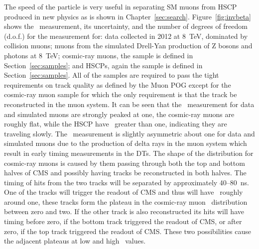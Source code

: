 The speed of the particle is very useful in separating SM muons from HSCP produced in new physics as is shown in Chapter~\ref{sec:search}.
Figure~\ref{fig:invbeta} shows the \invbeta\ measurement, its uncertainty, and the number of degrees of freedom (d.o.f.) for the measurement for:
data collected in 2012 at 8~TeV, dominated by collision muons; 
muons from the simulated Drell-Yan production of Z bosons and photons at 8~TeV; cosmic-ray muons, the sample is defined in Section~\ref{sec:samples};
and HSCPs, again the sample is defined in Section~\ref{sec:samples}. All of the samples are required to pass the tight requirements on track quality
as defined by the Muon POG except for the cosmic-ray muon sample for which the only requirement is that the track be reconstructed in the muon system.
It can be seen that the \invbeta\ measurement for data and simulated muons are strongly peaked at one, the cosmic-ray muons are roughly flat, while
the HSCP have \invbeta\ greater than one, indicating they are traveling slowly. The \invbeta\ measurement is slightly asymmetric about one for data and simulated muons
due to the production of delta rays in the muon system which result in early timing measurements in the DTs. The shape of the distribution for cosmic-ray muons
is caused by them passing through both the top and bottom halves of CMS and possibly having tracks be reconstructed in both halves.
The timing of hits from the two tracks will be separated by approximately 40--80~ns.
One of the tracks will trigger the readout of CMS and thus will have \invbeta\ roughly around one, these tracks form the plateau in the cosmic-ray muon \invbeta\
distribution between zero and two. If the other track is also reconstructed its hits will have timing before zero, if the bottom track triggered the readout of CMS, or
after zero, if the top track triggered the readout of CMS. These two possibilities cause the adjacent plateaus at low and high \invbeta\ values.

